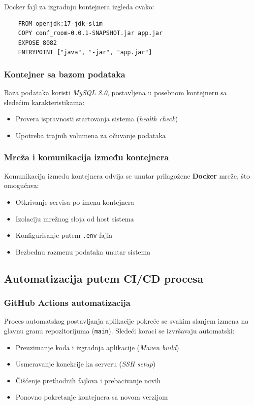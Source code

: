 \documentclass[12pt]{article}
\begin{document}
    \newpage

    Docker fajl za izgradnju kontejnera izgleda ovako:

    \begin{verbatim}
    FROM openjdk:17-jdk-slim
    COPY conf_room-0.0.1-SNAPSHOT.jar app.jar
    EXPOSE 8082
    ENTRYPOINT ["java", "-jar", "app.jar"]
    \end{verbatim}

    \subsubsection*{Kontejner sa bazom podataka}

    Baza podataka koristi \textit{MySQL 8.0}, postavljena u posebnom kontejneru sa sledećim karakteristikama:
    \begin{itemize}
    \item Provera ispravnosti startovanja sistema (\textit{health check})
    \item Upotreba trajnih volumena za očuvanje podataka
    \end{itemize}
    
    \subsubsection*{Mreža i komunikacija između kontejnera}

    Komunikacija između kontejnera odvija se unutar prilagožene \textbf{Docker} mreže, što omogućava:
    \begin{itemize}
      \item Otkrivanje servisa po imenu kontejnera
      \item Izolaciju mrežnog sloja od host sistema
      \item Konfigurisanje putem \texttt{.env} fajla
      \item Bezbednu razmenu podataka unutar sistema
    \end{itemize}

    \subsection{Automatizacija putem CI/CD procesa}

    \subsubsection*{GitHub Actions automatizacija}

    Proces automatskog postavljanja aplikacije pokreće se svakim slanjem izmena na glavnu granu repozitorijuma (\texttt{main}). Sledeći koraci se izvršavaju automatski:
    \begin{itemize}
    \item Preuzimanje koda i izgradnja aplikacije (\textit{Maven build})
    \item Usmeravanje konekcije ka serveru (\textit{SSH setup})
    \item Čišćenje prethodnih fajlova i prebacivanje novih
    \item Ponovno pokretanje kontejnera sa novom verzijom
    \end{itemize}
\end{document}
